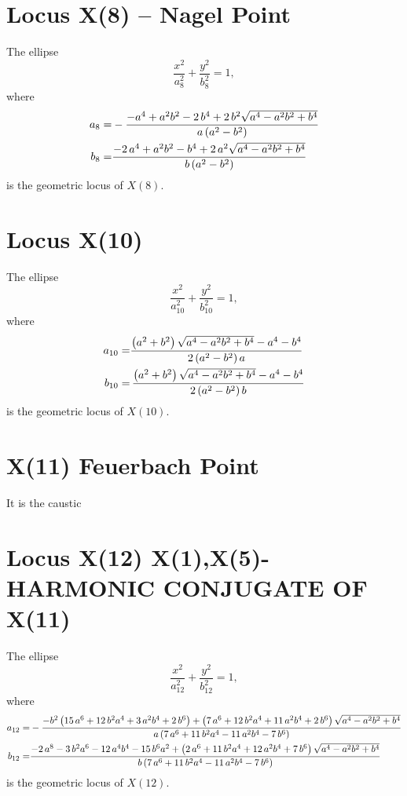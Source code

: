 \documentclass[11pt]{amsart}
\theoremstyle{plain}
\theoremstyle{definition}
\begin{document}
   
         \section{Locus X(8) -- Nagel Point}
   
   The ellipse \[ \frac{x^2}{a_{8}^2}+\frac{y^2}{b_{8}^2}=1, \]
   where
   \[\aligned 
   a_{8}=&   -{\frac {-{a}^{4}+{a}^{2}{b}^{2}-2\,{b}^{4}+2\,b^2\sqrt {{a}^{4}-{a}^{2}{
   				b}^{2}+{b}^{4}} }{a \left( a^2-b^2\right)   }}
   \\
   b_{8}=&  {\frac {-2\,{a}^{4}+{a}^{2}{b}^{2}-{b}^{4}+2\,{a}^{2} \sqrt {{a}^{4}-{a}^{2}{b
   			}^{2}+{b}^{4}}}{b \left( {a}^{2}-{b}^{2} \right) }}
   \endaligned\] 
   is the geometric locus of $X(8)$.
   
   
      \section{Locus X(10)}
      
       The ellipse \[ \frac{x^2}{a_{10}^2}+\frac{y^2}{b_{10}^2}=1, \]
      where
      \[\aligned 
      a_{10}=&    {\frac { \left( {a}^{2}+{b}^{2} \right) \sqrt {{a}^{4}-{a}^{2}{b}
      			^{2}+{b}^{4}}-{a}^{4}-{b}^{4}}{ 2\left( {a}^{2}-{b}^{2} \right) a}}
\\
b_{10}=& \,{\frac { \left( {a}^{2}+{b}^{2} \right) \sqrt {{a}^{4}-{a}^{2}{b}
			^{2}+{b}^{4}}-{a}^{4}-{b}^{4}}{ 2\left( {a}^{2}-{b}^{2} \right) b}}
%
\endaligned\] 
is the geometric locus of $X(10)$.

 \section{  X(11)  {Feuerbach Point} }
 
 It is the caustic

\section{Locus X(12)  {X(1),X(5)}-HARMONIC CONJUGATE OF X(11) }

The ellipse \[ \frac{x^2}{a_{12}^2}+\frac{y^2}{b_{12}^2}=1, \]
where
\[\aligned 
a_{12}=&     -{\frac {-{b}^{2} \left( 15\,{a}^{6}+12\,{b}^{2}{a}^{4}+3\,{a}^{2}{b}^
		{4}+2\,{b}^{6} \right) + \left( 7\,{a}^{6}+12\,{b}^{2}{a}^{4}+11\,{a}^
		{2}{b}^{4}+2\,{b}^{6} \right) \sqrt {{a}^{4}-{a}^{2}{b}^{2}+{b}^{4}}}{
		a \left( 7\,{a}^{6}+11\,{b}^{2}{a}^{4}-11\,{a}^{2}{b}^{4}-7\,{b}^{6}
		\right) }}
%
\\
b_{12}=&  {\frac {-2\,{a}^{8}-3\,{b}^{2}{a}^{6}-12\,{a}^{4}{b}^{4}-15\,{b}^{6}{a
		}^{2}+ \left( 2\,{a}^{6}+11\,{b}^{2}{a}^{4}+12\,{a}^{2}{b}^{4}+7\,{b}^
		{6} \right) \sqrt {{a}^{4}-{a}^{2}{b}^{2}+{b}^{4}}}{b \left( 7\,{a}^{6
		}+11\,{b}^{2}{a}^{4}-11\,{a}^{2}{b}^{4}-7\,{b}^{6} \right) }}
%
%
\endaligned\] 
is the geometric locus of $X(12)$.
\end{document}
